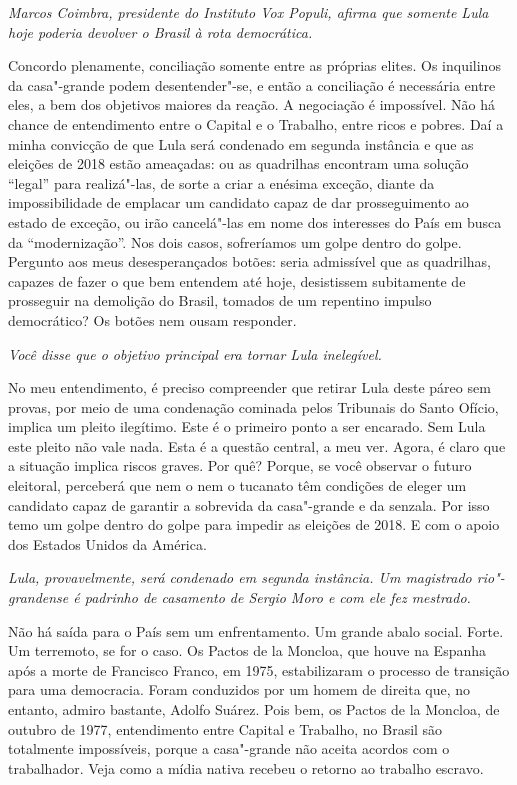 \itshape
Marcos Coimbra, presidente do Instituto Vox Populi,
afirma que somente Lula hoje poderia devolver o Brasil à rota
democrática.

\normalfont 
Concordo plenamente, conciliação somente entre as
próprias elites. Os inquilinos da casa"-grande podem desentender"-se, e
então a conciliação é necessária entre eles, a bem dos objetivos maiores
da reação. A negociação é impossível. Não há chance de entendimento
entre o Capital e o Trabalho, entre ricos e pobres. Daí a minha
convicção de que Lula será condenado em segunda instância e que as
eleições de 2018 estão ameaçadas: ou as quadrilhas encontram uma solução
``legal'' para realizá"-las, de sorte a criar a enésima exceção, diante
da impossibilidade de emplacar um candidato capaz de dar prosseguimento
ao estado de exceção, ou irão cancelá"-las em nome dos interesses do País
em busca da ``modernização''. Nos dois casos, sofreríamos um golpe
dentro do golpe. Pergunto aos meus desesperançados botões: seria
admissível que as quadrilhas, capazes de fazer o que bem entendem até
hoje, desistissem subitamente de prosseguir na demolição do Brasil,
tomados de um repentino impulso democrático? Os botões nem ousam
responder.

\itshape
Você disse que o objetivo principal era tornar Lula
inelegível.

\normalfont 
No meu entendimento, é preciso compreender que retirar
Lula deste páreo sem provas, por meio de uma condenação cominada pelos
Tribunais do Santo Ofício, implica um pleito ilegítimo. Este é o
primeiro ponto a ser encarado. Sem Lula este pleito não vale nada. Esta
é a questão central, a meu ver. Agora, é claro que a situação implica
riscos graves. Por quê? Porque, se você observar o futuro eleitoral,
perceberá que nem o  nem o tucanato têm condições de eleger um
candidato capaz de garantir a sobrevida da casa"-grande e da senzala. Por
isso temo um golpe dentro do golpe para impedir as eleições de 2018. E
com o apoio dos Estados Unidos da América.

\itshape
Lula, provavelmente, será condenado em segunda
instância. Um magistrado rio"-grandense é padrinho de casamento de Sergio
Moro e com ele fez mestrado.

\normalfont 
Não há saída para o País sem um enfrentamento. Um grande
abalo social. Forte. Um terremoto, se for o caso. Os Pactos de la
Moncloa, que houve na Espanha após a morte de Francisco Franco, em 1975,
estabilizaram o processo de transição para uma democracia. Foram
conduzidos por um homem de direita que, no entanto, admiro bastante,
Adolfo Suárez. Pois bem, os Pactos de la Moncloa, de outubro de 1977,
entendimento entre Capital e Trabalho, no Brasil são totalmente
impossíveis, porque a casa"-grande não aceita acordos com o trabalhador.
Veja como a mídia nativa recebeu o retorno ao trabalho escravo.

